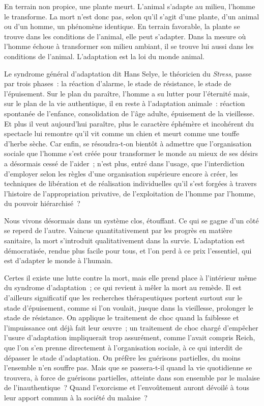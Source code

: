 \documentclass[french,twoside]{book} %
\begin{document}
\noindent En terrain non propice, une plante meurt. L’animal s’adapte au milieu, l’homme le transforme. La mort n’est donc pas, selon qu’il s’agit d’une plante, d’un animal ou d’un homme, un phénomène identique. En terrain favorable, la plante se trouve dans les conditions de l’animal, elle peut s’adapter. Dans la mesure où l’homme échoue à transformer son milieu ambiant, il se trouve lui aussi dans les conditions de l’animal. L’adaptation est la loi du monde animal.\par
Le syndrome général d’adaptation dit Hans Selye, le théoricien du \emph{Stress}, passe par trois phases : la réaction d’alarme, le stade de résistance, le stade de l’épuisement. Sur le plan du paraître, l’homme a su lutter pour l’éternité mais, sur le plan de la vie authentique, il en reste à l’adaptation animale : réaction spontanée de l’enfance, consolidation de l’âge adulte, épuisement de la vieillesse. Et plus il veut aujourd’hui paraître, plus le caractère éphémère et incohérent du spectacle lui remontre qu’il vit comme un chien et meurt comme une touffe d’herbe sèche. Car enfin, se résoudra-t-on bientôt à admettre que l’organisation sociale que l’homme s’est créée pour transformer le monde au mieux de ses désirs a désormais cessé de l’aider ; n’est plus, entré dans l’usage, que l’interdiction d’employer selon les règles d’une organisation supérieure encore à créer, les techniques de libération et de réalisation individuelles qu’il s’est forgées à travers l’histoire de l’appropriation privative, de l’exploitation de l’homme par l’homme, du pouvoir hiérarchisé ?\par
Nous vivons désormais dans un système clos, étouffant. Ce qui se gagne d’un côté se reperd de l’autre. Vaincue quantitativement par les progrès en matière sanitaire, la mort s’introduit qualitativement dans la survie. L’adaptation est démocratisée, rendue plus facile pour tous, et l’on perd à ce prix l’essentiel, qui est d’adapter le monde à l’humain.\par
Certes il existe une lutte contre la mort, mais elle prend place à l’intérieur même du syndrome d’adaptation ; ce qui revient à mêler la mort au remède. Il est d’ailleurs significatif que les recherches thérapeutiques portent surtout sur le stade d’épuisement, comme si l’on voulait, jusque dans la vieillesse, prolonger le stade de résistance. On applique le traitement de choc quand la faiblesse et l’impuissance ont déjà fait leur œuvre ; un traitement de choc chargé d’empêcher l’usure d’adaptation impliquerait trop assurément, comme l’avait compris Reich, que l’on s’en prenne directement à l’organisation sociale, à ce qui interdit de dépasser le stade d’adaptation. On préfère les guérisons partielles, du moins l’ensemble n’en souffre pas. Mais que se passera-t-il quand la vie quotidienne se trouvera, à force de guérisons partielles, atteinte dans son ensemble par le malaise de l’inauthentique ? Quand l’exorcisme et l’envoûtement auront dévoilé à tous leur apport commun à la société du malaise ?\par
\end{document}

